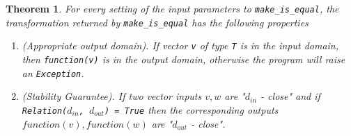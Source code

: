 \documentclass[11pt,a4paper]{article}
\newtheorem{theorem}{Theorem}[section]
\begin{document}
\begin{theorem}
For every setting of the input parameters to \texttt{make\_is\_equal}, the transformation returned by \texttt{make\_is\_equal} has the following properties
\begin{enumerate}
    \item \textup{(Appropriate output domain).} If vector \texttt{v} of type \texttt{T} is in the input domain, then \texttt{function(v)} is in the output domain, otherwise the program will raise an \texttt{Exception}. 
    \item \textup{(Stability Guarantee).} If two vector inputs $v, w$ are "$d_{in}$ - close" and if \texttt{Relation($d_{in}$, $d_{out}$) = True} then the corresponding outputs $function(v), function(w)$ are "$d_{out}$ - close". 
\end{enumerate}
\end{theorem}
\end{document}
